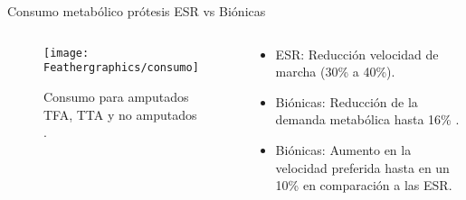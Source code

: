 \documentclass[10pt]{beamer}
\begin{document}
\begin{frame}{Consumo metabólico prótesis ESR vs Biónicas}

\begin{columns}[t]


\column{65 mm}
\begin{block}{}
{\footnotesize{}}

\begin{figure}
\begin{centering}
\texttt{[image: Feathergraphics/consumo]}
\par\end{centering}
\caption{{\scriptsize{}Consumo para amputados TFA, TTA y no amputados \cite{Schmalz2002}.}}
\end{figure}

\end{block}

\column{50 mm}
\begin{exampleblock}{}

\begin{itemize}
\item {\scriptsize{}ESR: Reducción velocidad de marcha (30\% a 40\%)\cite{Schmalz2002}.}{\scriptsize \par}
\end{itemize}
\vspace{2 mm}
\begin{itemize}
\item {\scriptsize{}Biónicas: Reducción de la demanda metabólica hasta 16\%
\cite{Herr2010,Esposito2015}.}{\scriptsize \par}
\end{itemize}
\vspace{2 mm}
\begin{itemize}
\item {\scriptsize{}Biónicas: Aumento en la velocidad preferida hasta en
un 10\% en comparación a las ESR\cite{Gates2013}.}{\scriptsize \par}
\end{itemize}
\end{exampleblock}
\end{columns}

\end{frame}
\end{document}
